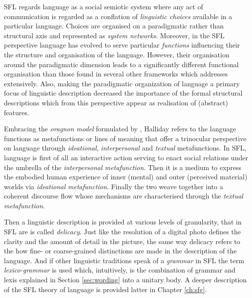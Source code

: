 SFL regards language as a social semiotic system where any act of communication is regarded as a conflation of \textit{linguistic choices} available in a particular language. Choices are organised on a paradigmatic rather than structural axis and represented as \textit{system networks}. Moreover, in the SFL perspective language has evolved to serve particular \textit{functions} influencing their the structure and organisation of the language. However, their organisation around the paradigmatic dimension leads to a significantly different functional organisation than those found in several other frameworks which \citet{Butler2003-pt1, Butler2003-pt2} addresses extensively. 
Also, making the paradigmatic organization of language a primary focus of linguistic description decreased the importance of the formal structural descriptions which from this perspective appear as realisation of (abstract) features. 

Embracing the \textit{oragnon model} formulated by \citet{Buhler34}, Halliday refers to the language functions as metafunctions or lines of meaning that offer a trinocular perspective on language through \textit{ideational}, \textit{interpersonal} and \textit{textual} metafunctions. In SFL, language is first of all an interactive action serving to enact social relations under the umbrella of the \textit{interpersonal metafunction}. Then it is a medium to express the embodied human experience of inner (mental) and outer (perceived material) worlds via \textit{ideational metafunction}. Finally the two weave together into a coherent discourse flow whose mechanisms are characterised through the \textit{textual metafunction}. 

Then a linguistic description is provided at various levels of granularity, that in SFL are is called \textit{delicacy}. Just like the resolution of a digital photo defines the clarity and the amount of detail in the picture, the same way delicacy refers to the how fine- or coarse-grained distinctions are made in the description of the language. And if other linguistic traditions speak of a \textit{grammar} in SFL the term \textit{lexico-grammar} is used which, intuitively, is the combination of grammar and lexis explained in Section \ref{sec:wording} into a unitary body. A deeper description of the SFL theory of language is provided latter in Chapter \ref{ch:sfg}.


